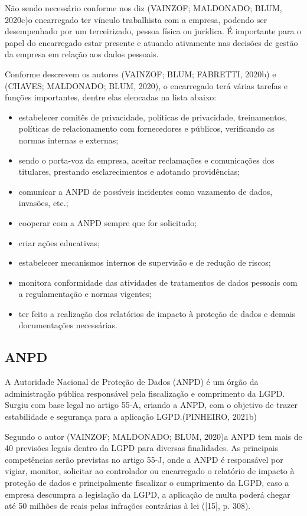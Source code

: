 \documentclass[
	12pt,				%
	openright,			%
	oneside,			%
	a4paper,			%
	english,			%
	french,				%
	spanish,			%
	brazil,				%
	]{abntex2}
\begin{document}
Não sendo necessário conforme nos diz (VAINZOF; MALDONADO; BLUM, 2020c)o encarregado ter vínculo trabalhista com a empresa, podendo ser desempenhado por um terceirizado, pessoa física ou jurídica.  É importante para o papel do encarregado estar presente e atuando ativamente nas decisões de gestão da empresa em relação aos dados pessoais.

Conforme descrevem os autores (VAINZOF; BLUM; FABRETTI, 2020b) e  (CHAVES; MALDONADO; BLUM, 2020), o encarregado terá várias tarefas e funções importantes, dentre elas elencadas na lista abaixo:


\begin{itemize}
\item estabelecer comitês de privacidade, políticas de privacidade, treinamentos, políticas de relacionamento com fornecedores e públicos, verificando as normas internas e externas;
\item sendo o porta-voz da empresa, aceitar reclamações e comunicações dos titulares, prestando esclarecimentos e adotando providências;
\item comunicar a ANPD de possíveis incidentes como vazamento de dados, invasões, etc.; 
\item cooperar com a ANPD sempre que for solicitado;
\item criar ações educativas;
\item estabelecer mecanismos internos de supervisão e de redução de riscos;
\item monitora conformidade das atividades de tratamentos de dados pessoais com a regulamentação e normas vigentes;
\item ter feito a realização dos relatórios de impacto à proteção de dados e demais documentações necessárias.
\end{itemize}

\subsection{ANPD}

A Autoridade Nacional de Proteção de Dados (ANPD) é um órgão da administração pública responsável pela fiscalização e comprimento da LGPD. Surgiu com base legal no artigo 55-A, criando a ANPD, com o objetivo de trazer estabilidade e segurança para a aplicação LGPD.(PINHEIRO, 2021b)

Segundo o autor (VAINZOF; MALDONADO; BLUM, 2020)a ANPD tem mais de 40 previsões legais dentro da LGPD para diversas finalidades. As principais competências serão previstas no artigo 55-J, onde a ANPD é responsável por vigiar, monitor, solicitar ao controlador ou encarregado o relatório de impacto à proteção de dados e principalmente fiscalizar o cumprimento da LGPD, caso a empresa descumpra a legislação da LGPD, a aplicação de multa poderá chegar até 50 milhões de reais pelas infrações contrárias à lei      ([15], p. 308).  
\end{document}
